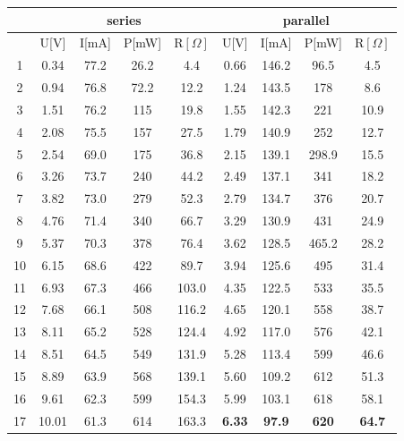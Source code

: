 \documentclass[12pt]{article}
\begin{document}
\begin{table}[H]
\centering
\begin{tabular}{|c|c|c|c|c|c|c|c|c|}
\hline
   & \multicolumn{4}{c|}{series}      & \multicolumn{4}{c|}{parallel}      \\ \hline
   & U[V]        & I[mA]  &P[mW] &R$[\Omega]$    & U[V]        & I[mA]    &P[mW]  &R$[\Omega]$  \\ \hline
1  & 0.34     & 77.2      & 26.2&4.4      & 0.66     & 146.2     & 96.5  &4.5   \\ \hline
2  & 0.94     & 76.8      & 72.2&12.2     & 1.24     & 143.5     & 178   &8.6   \\ \hline
3  & 1.51     & 76.2      & 115 &19.8     & 1.55     & 142.3     & 221   &10.9   \\ \hline
4  & 2.08     & 75.5      & 157 &27.5     & 1.79     & 140.9     & 252   &12.7   \\ \hline
5  & 2.54     & 69.0      & 175 &36.8     & 2.15     & 139.1     & 298.9 &15.5   \\ \hline
6  & 3.26     & 73.7      & 240 &44.2     & 2.49     & 137.1     & 341   &18.2   \\ \hline
7  & 3.82     & 73.0      & 279 &52.3     & 2.79     & 134.7     & 376   &20.7   \\ \hline
8  & 4.76     & 71.4      & 340 &66.7     & 3.29     & 130.9     & 431   &24.9   \\ \hline
9  & 5.37     & 70.3      & 378 &76.4     & 3.62     & 128.5     & 465.2 &28.2   \\ \hline
10 & 6.15     & 68.6      & 422 &89.7     & 3.94     & 125.6     & 495   &31.4   \\ \hline
11 & 6.93     & 67.3      & 466 &103.0     & 4.35     & 122.5     & 533   &35.5   \\ \hline
12 & 7.68     & 66.1      & 508 &116.2     & 4.65     & 120.1     & 558   &38.7   \\ \hline
13 & 8.11     & 65.2      & 528 &124.4     & 4.92     & 117.0     & 576   &42.1   \\ \hline
14 & 8.51     & 64.5      & 549 &131.9     & 5.28     & 113.4     & 599   &46.6   \\ \hline
15 & 8.89     & 63.9      & 568 &139.1     & 5.60     & 109.2     & 612   &51.3   \\ \hline
16 & 9.61     & 62.3      & 599 &154.3     & 5.99     & 103.1     & 618   &58.1   \\ \hline
17 & 10.01    & 61.3      & 614 &163.3     & \textbf{6.33}     & \textbf{97.9}      & \textbf{620}  &\textbf{64.7}    \\ \hline

\end{tabular}
\end{table}
\end{document}

